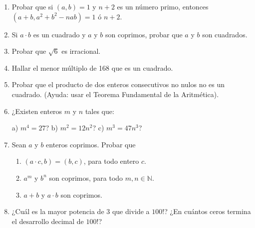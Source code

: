 \documentclass[a4paper,12pt,twoside,spanish,reqno]{amsbook}
\numberwithin{equation}{section}
\begin{document}
\begin{enumerate}
\item Probar que si $(a,b)=1$ y $n+2$ es un n\'umero primo, entonces $(a+b, a^2 + b^2 - nab) = 1$ \'o $n+2$.





\item Si $a\cdot b$ es un cuadrado y $a$ y $b$ son coprimos, probar que $a$ y $b$ son cuadrados.



\medskip

\item Probar que $\sqrt 6$ es irracional.







\medskip

\item Hallar el menor m\'ultiplo de 168 que es un cuadrado.



\medskip

\item Probar que el producto de dos enteros consecutivos no nulos no es un cuadrado. (Ayuda: usar el Teorema Fundamental de la Aritm\'etica).

\medskip



\item ¿Existen enteros $m$ y $n$ tales que:

a) $m^4=27$? \qquad \qquad b) $m^2 = 12n^2$? \qquad \qquad c) $m^3 = 47n^3$?





\item Sean $a$ y $b$ enteros coprimos. Probar que
\begin{enumerate}
  \item $(a\cdot c, b)=(b,c)$, para todo entero $c$.
  \item $a^m$ y $b^n$ son coprimos, para todo $m,n\in \mathbb N$.
  \item $a+b$ y $a\cdot b$ son coprimos.
\end{enumerate}






\item ¿Cu\'al es la mayor potencia de $3$ que divide a $100!$? ¿En cu\'antos ceros termina el de\-sa\-rro\-llo decimal de $100!$?




\end{enumerate}
\end{document}

